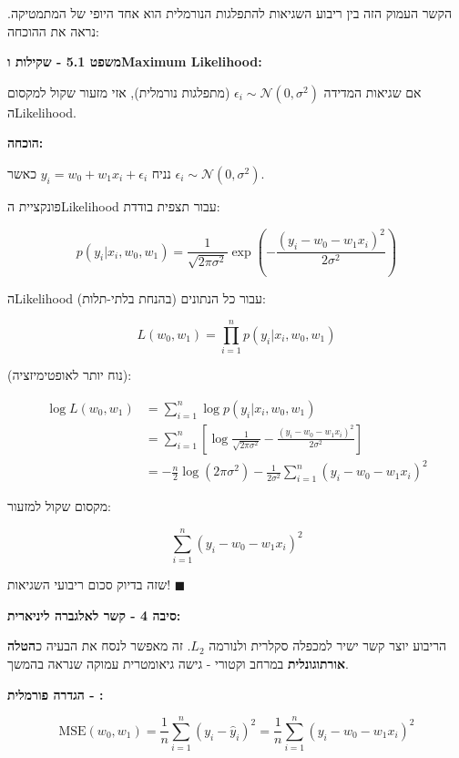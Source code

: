 הקשר העמוק הזה בין ריבוע השגיאות להתפלגות הנורמלית הוא אחד היופי של המתמטיקה. נראה את ההוכחה:

\textbf{משפט \num{5.1} - שקילות  ו\en{-}Maximum Likelihood:}

אם שגיאות המדידה $\epsilon_i \sim \mathcal{N}(0, \sigma^2)$ (מתפלגות נורמלית), אזי מזעור  שקול למקסום ה\en{-}Likelihood.

\textbf{הוכחה:}

נניח $y_i = w_0 + w_1 x_i + \epsilon_i$ כאשר $\epsilon_i \sim \mathcal{N}(0, \sigma^2)$.

פונקציית ה\en{-}Likelihood עבור תצפית בודדת:

\begin{equation}
p(y_i | x_i, w_0, w_1) = \frac{1}{\sqrt{2\pi\sigma^2}} \exp\left(-\frac{(y_i - w_0 - w_1 x_i)^2}{2\sigma^2}\right)
\end{equation}

ה\en{-}Likelihood עבור כל הנתונים (בהנחת בלתי-תלות):

\begin{equation}
L(w_0, w_1) = \prod_{i=1}^{n} p(y_i | x_i, w_0, w_1)
\end{equation}

 (נוח יותר לאופטימיזציה):

\begin{align}
\log L(w_0, w_1) &= \sum_{i=1}^{n} \log p(y_i | x_i, w_0, w_1) \nonumber \\
&= \sum_{i=1}^{n} \left[ \log\frac{1}{\sqrt{2\pi\sigma^2}} - \frac{(y_i - w_0 - w_1 x_i)^2}{2\sigma^2} \right] \nonumber \\
&= -\frac{n}{2}\log(2\pi\sigma^2) - \frac{1}{2\sigma^2} \sum_{i=1}^{n} (y_i - w_0 - w_1 x_i)^2
\end{align}

מקסום  שקול למזעור:

\begin{equation}
\sum_{i=1}^{n} (y_i - w_0 - w_1 x_i)^2
\end{equation}

שזה בדיוק סכום ריבועי השגיאות! $\blacksquare$

\textbf{סיבה \num{4} - קשר לאלגברה ליניארית:}

הריבוע יוצר קשר ישיר למכפלה סקלרית ולנורמה $L_2$. זה מאפשר לנסח את הבעיה כ\textbf{הטלה אורתוגונלית} במרחב וקטורי - גישה גיאומטרית עמוקה שנראה בהמשך.

\textbf{הגדרה פורמלית - :}

\begin{equation}
\text{MSE}(w_0, w_1) = \frac{1}{n} \sum_{i=1}^{n} (y_i - \hat{y}_i)^2 = \frac{1}{n} \sum_{i=1}^{n} (y_i - w_0 - w_1 x_i)^2
\end{equation}


